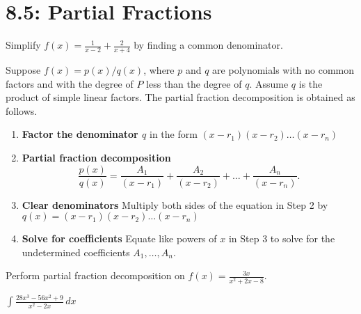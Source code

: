 \documentclass[../mathNotesPreamble]{subfiles}
\begin{document}
  \section{8.5: Partial Fractions}
  \begin{ex*}
    Simplify $\displaystyle f(x)=\frac{1}{x-2}+\frac{2}{x+4}$ by finding a common denominator.
  \end{ex*}

  \begin{thmBox*}
    Suppose $f(x)=p(x)/q(x)$, where $p$ and $q$ are polynomials with no common factors and with the degree of $P$ less than the degree of $q$. Assume $q$ is the product of simple linear factors. The partial fraction decomposition is obtained as follows.
    \begin{enumerate}[label=\textbf{Step \arabic*:}, itemindent=1.5\labelwidth]
      \item \textbf{Factor the denominator $q$} in the form $(x-r_1)(x-r_2)\dots(x-r_n)$
      \item \textbf{Partial fraction decomposition}
        \[\frac{p(x)}{q(x)}=\frac{A_1}{(x-r_1)}+\frac{A_2}{(x-r_2)}+\dots+\frac{A_n}{(x-r_n)}.\]
      \item \textbf{Clear denominators} Multiply both sides of the equation in Step 2 by $q(x)=(x-r_1)(x-r_2)\dots(x-r_n)$
      \item \textbf{Solve for coefficients} Equate like powers of $x$ in Step 3 to solve for the undetermined coefficients $A_1,\dots,A_n$.
    \end{enumerate}
  \end{thmBox*}

  \begin{ex*}
    Perform partial fraction decomposition on $\displaystyle f(x)=\frac{3x}{x^2+2x-8}$.
  \end{ex*}
  \pagebreak

  \begin{ex*}
    $\displaystyle \int \frac{28x^3-56x^2+9}{x^2-2x}\,dx$
  \end{ex*}
  \pagebreak
\end{document}
